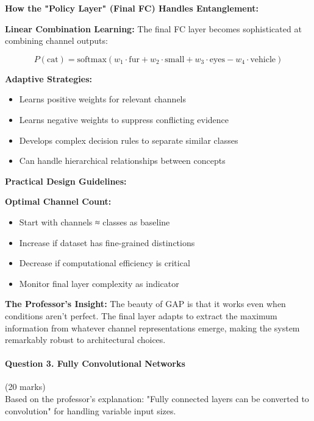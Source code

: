 \documentclass[12pt]{article}
\newcommand{\explanation}[1]{{\color{explanationcolor}#1}}
\begin{document}
\begin{enumerate}[(a)]
{    \textbf{How the "Policy Layer" (Final FC) Handles Entanglement:}
    
    \explanation{
    \textbf{Linear Combination Learning:}
    The final FC layer becomes sophisticated at combining channel outputs:
    
    \[
    P(\text{cat}) = \text{softmax}(w_1 \cdot \text{fur} + w_2 \cdot \text{small} + w_3 \cdot \text{eyes} - w_4 \cdot \text{vehicle})
    \]
    
    \textbf{Adaptive Strategies:}
    \begin{itemize}
        \item Learns positive weights for relevant channels
        \item Learns negative weights to suppress conflicting evidence
        \item Develops complex decision rules to separate similar classes
        \item Can handle hierarchical relationships between concepts
    \end{itemize}
    }
    
    \textbf{Practical Design Guidelines:}
    
    \explanation{
    \textbf{Optimal Channel Count:}
    \begin{itemize}
        \item Start with channels ≈ classes as baseline
        \item Increase if dataset has fine-grained distinctions
        \item Decrease if computational efficiency is critical
        \item Monitor final layer complexity as indicator
    \end{itemize}
    
    \textbf{The Professor's Insight:}
    The beauty of GAP is that it works even when conditions aren't perfect. The final layer adapts to extract the maximum information from whatever channel representations emerge, making the system remarkably robust to architectural choices.
    }
    }
\end{enumerate}

\newpage
\paragraph{Question 3. Fully Convolutional Networks}{\hfill (20 marks)}\\
Based on the professor's explanation: "Fully connected layers can be converted to convolution" for handling variable input sizes.
\end{document}
